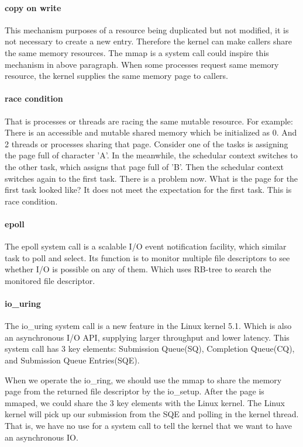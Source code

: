 \documentclass[12pt,a4paper]{IEEEconf}
\begin{document}
\paragraph{copy on write}
This mechanism purposes of a resource being duplicated but not modified, it is not
necessary to create a new entry. Therefore the kernel can make callers share
the same memory resources. The mmap is a system call could inspire this mechanism
in above paragraph. When some processes request same memory resource, the kernel
supplies the same memory page to callers.

\paragraph{race condition}
That is processes or threads are racing the same mutable resource. For example:
There is an accessible and mutable shared memory which be initialized as 0. And
2 threads or processes sharing that page. Consider one of the tasks is assigning
the page full of character 'A'. In the meanwhile, the schedular context switches to
the other task, which assigns that page full of 'B'. Then the schedular context switches
again to the first task. There is a problem now. What is the page for the first
task looked like? It does not meet the expectation for the first task.
This is race condition.

\paragraph{epoll}
The epoll system call is a scalable I/O event notification facility, which similar
task to poll and select. Its function is to monitor multiple file descriptors to
see whether I/O is possible on any of them. Which uses RB-tree to search the monitored
file descriptor.

\paragraph{io\_uring}
The io\_uring system call is a new feature in the Linux kernel 5.1. Which is also an
asynchronous I/O API, supplying larger throughput and lower latency. This system call
has 3 key elements: Submission Queue(SQ), Completion Queue(CQ), and Submission Queue
Entries(SQE).

When we operate the io\_ring, we should use the mmap to share the memory page from
the returned file descriptor by the io\_setup. After the page is mmaped, we could share
the 3 key elements with the Linux kernel. The Linux kernel will pick up our submission
from the SQE and polling in the kernel thread. That is, we have no use for a system call
to tell the kernel that we want to have an asynchronous IO.
\end{document}
